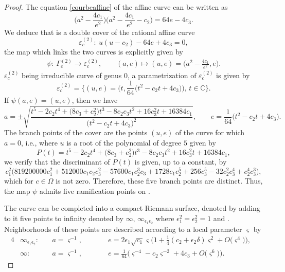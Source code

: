 \documentclass[pdftex]{sigma}
\numberwithin{equation}{section}
\begin{document}
\begin{proof}
The equation \eqref{courbeaffine} of the affine curve
 can be written as
\[\biggl(a^2-\frac{4c_1}{e^2}\biggr)\biggl(a^2-\frac{4c_1}{e^2}-c_2\biggr)=64e-4c_3.\]
 We deduce that  is a double cover of the rational affine curve
 \[\varepsilon_c^{(2)}\colon \ u(u-c_2)-64e+4c_3=0,\]
the map which links the two curves is explicitly given by
\begin{align*}
 \psi\colon \ \Gamma_c^{(2)} \longrightarrow \varepsilon_c^{(2)}, \qquad
 (a,e) \longmapsto (u,e)=\biggl(a^2-\frac{4c_1}{e^2},e\biggr).
\end{align*}
$\varepsilon_c^{(2)}$ being irreducible curve of genus
$0$, a parametrization of $\varepsilon_c^{(2)}$ is given
by \[ \varepsilon_c^{(2)}=\biggl\{
(u,e)=\biggl(t,\frac{1}{64}\bigl(t^2-c_2t+4c_3\bigr)\biggr),\, t
\in \mathbb{C}\biggr\}. \]
 If $\psi(a,e)=(u,e)$, then we have
 \begin{equation*}
 a=\pm\sqrt{\frac{t^5-2c_2t^4+\bigl(8c_3+c_2^2\bigr)t^3-8c_2c_3t^2+16c_3^2t+16384c_1}{\bigl(t^2 -c_2t+4c_3\bigr)^2}},
\qquad e=\frac{1}{64}\bigl(t^2-c_2t+4c_3\bigr).
\end{equation*}
The branch points of the cover  are the points
$(u,e)$ of the curve  for
which $a =0$, i.e., where $u$ is a root of the polynomial of degree
$5$ given by
 \[P(t)=t^5-2c_2t^4+\bigl(8c_3+c_2^2\bigr)t^3-8c_2c_3t^2+16c_3^2t+16384c_1,\]
 we verify that the discriminant of $P(t)$ is given, up to a constant, by
\[c_1^2\bigl(819200000c_1^2+512000c_1c_2c_3^2-57600c_1c_2^3c_3+1728c_1c_2^5+256c_3^5-32c_2^2c_3^4+c_2^4c_3^3\bigr),\]
which for $c \in \Omega$ is not zero. Therefore, these five branch points are distinct. Thus, the map $\psi$ admits five ramification points on .

The curve  can be completed into a compact Riemann surface, denoted  by adding to it
 five points to infinity denoted by $\infty$, $\infty_{\epsilon_1\epsilon_2}$
 where $\epsilon_1^2=\epsilon_2^2=1$ and . Neighborhoods of these points are described according to a local parameter $\varsigma$ by
\begin{alignat}{4}
&\infty_{\epsilon_1\epsilon_2}\colon \ && a =\varsigma^{-1}, \qquad &&
e =2\epsilon_1\sqrt{c_1}\varsigma\biggl(1+\frac{1}{4}(c_2+\epsilon_2\delta)\varsigma^2+O\bigl(\varsigma^4\bigr)\biggr), &\label{valeurde_inftyvarepsilonm2}\\
&\infty\colon \ && a =\varsigma^{-1}, \qquad &&
e=\frac{1}{64}\bigl(\varsigma^{-4}-c_2\varsigma^{-2}+4c_3+O\bigl(\varsigma^6\bigr)\bigr).&\label{valeurde_inftym2}
\end{alignat}


\end{proof}
\end{document}
